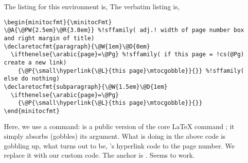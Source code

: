 \documentclass[10pt]{article}
\edef\amtIndent{\the\parindent}
\begin{document}
\begin{center}
\begin{minitocfmt}{\minitocFmtPara} %
\@A{\@PW{2.5em}\@R{3.8em}}
  {
    \@W{1em}\@D{0em}
      {}
      {}
  }
  {
    \@W{1.5em}\@D{1em}
      {}
      {}
  }
\end{minitocfmt}
\minitocFmtPara
{}
\begin{minipage}[c]{0.8\linewidth}
\insertminitoc[SExmpls]
\end{minipage}
\end{center}
The listing for this  environment is,
The verbatim listing is,
\begin{Verbatim}[xleftmargin=\amtIndent,fontsize=\small,commandchars=!()]
\begin{minitocfmt}{\minitocFmt}
\@A{\@PW{2.5em}\@R{3.8em}} %!sffamily( adj.! width of page number box and right margin of title)
\declaretocfmt{paragraph}{\@W{1em}\@D{0em}
  \ifthenelse{\arabic{page}=\@Pg} %!sffamily( if this page = !cs(@Pg) create a new link)
    {\@P{\small\hyperlink{\@L}{this page}\mtocgobble}}{}} %!sffamily( else do nothing)
\declaretocfmt{subparagraph}{\@W{1.5em}\@D{1em}
  \ifthenelse{\arabic{page}=\@Pg}
    {\@P{\small\hyperlink{\@L}{this page}\mtocgobble}}{}}
\end{minitocfmt}
\end{Verbatim}
Here, we use a  command:  is a public
version of the core {\LaTeX} command ; it simply absorbs
(gobbles) its argument. What  is doing in the above code is
gobbling up, what turns out to be, 's hyperlink code to the
page number. We replace it with our custom code. The anchor is .
Seems to work.
\end{document}
